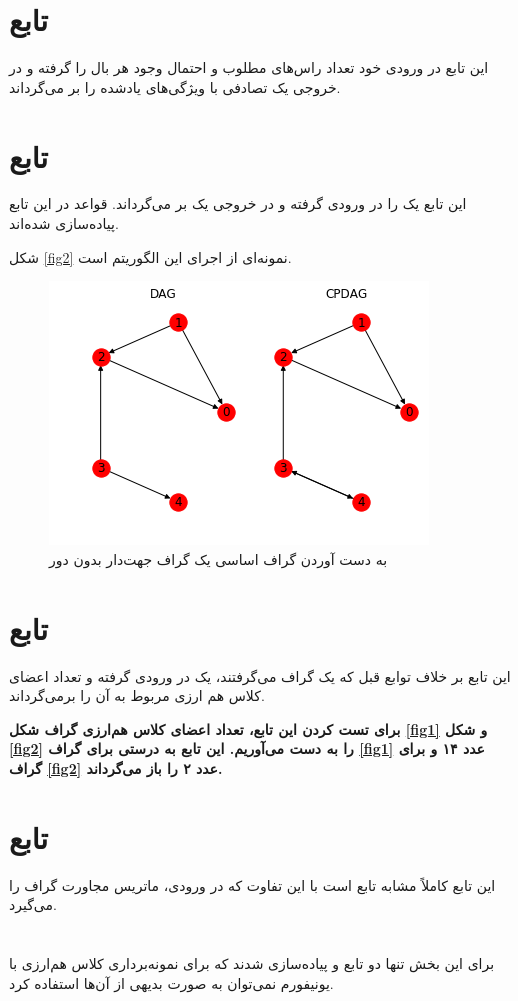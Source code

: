 \documentclass{article}
\begin{document}
\section{تابع
}
این تابع در ورودی خود تعداد راس‌های مطلوب و احتمال وجود هر بال را گرفته و در خروجی یک 
تصادفی با ویژگی‌های یادشده را  بر می‌گرداند. 
\section{تابع
}
این تابع یک 
را در ورودی گرفته و در خروجی یک 
بر می‌گرداند. قواعد 
در این تابع پیاده‌سازی شده‌اند.

شکل 
\eqref{fig2}
نمونه‌ای از اجرای این الگوریتم است.
\begin{figure}[h!]
	\includegraphics[scale=0.6]{meek.png}
	\caption{به دست آوردن گراف اساسی یک گراف جهت‌دار بدون دور}
	\label{fig2}
\end{figure}

\section{تابع 
}
این تابع بر خلاف توابع قبل که یک گراف 
می‌گرفتند، یک 
در ورودی گرفته و تعداد اعضای کلاس هم ارزی مربوط به آن را برمی‌گرداند. 

\textbf{
برای تست کردن این تابع، تعداد اعضای کلاس هم‌ارزی گراف شکل \eqref{fig1} و شکل \eqref{fig2} را به دست می‌آوریم. این تابع به درستی برای گراف \eqref{fig1} عدد ۱۴  و برای گراف \eqref{fig2} عدد ۲ را باز می‌گرداند.}

\section{تابع 
}
این تابع کاملاً مشابه تابع 
است با این تفاوت که در ورودی، ماتریس مجاورت گراف را می‌گیرد.

\section{
}
برای این بخش تنها دو تابع 
و 
پیاده‌سازی شدند که برای نمونه‌برداری کلاس هم‌ارزی با  یونیفورم نمی‌توان به صورت بدیهی از آن‌ها استفاده کرد. 
\newpage


\end{document}
